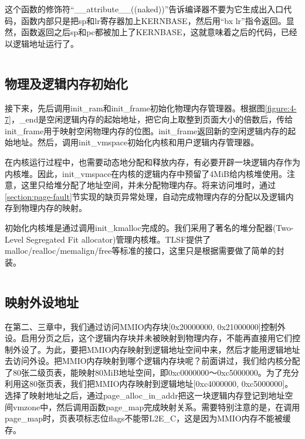 \documentclass[main.tex]{subfiles}
\begin{document}
\begin{CJK*}{UTF8}{song}
这个函数的修饰符“\_\_attribute\_\_((naked))”告诉编译器不要为它生成出入口代码，函数内部只是把sp和lr寄存器加上KERNBASE，然后用“bx lr”指令返回。显然，函数返回之后sp和pc都被加上了KERNBASE，这就意味着之后的代码，已经以逻辑地址运行了。

\begin{code}
\label{code:4-25}
\inputminted[firstline=337,lastline=345,linenos,numbersep=5pt,frame=lines,framesep=2mm]{c}{src/chapter04/kernel/machdep.c}
\end{code}

\subsection{物理及逻辑内存初始化}
接下来，先后调用init\_ram和init\_frame初始化物理内存管理器。根据图\ref{figure:4-7}，\_end是空闲逻辑内存的起始地址，把它向上取整到页面大小的倍数后，传给init\_frame用于映射空闲物理内存的位图。init\_frame返回新的空闲逻辑内存的起始地址。然后，调用init\_vmspace初始化内核和用户逻辑内存管理器。

\par
在内核运行过程中，也需要动态地分配和释放内存，有必要开辟一块逻辑内存作为内核堆。因此，init\_vmspace在内核的逻辑内存中预留了4MiB给内核堆使用。注意，这里只给堆分配了地址空间，并未分配物理内存。将来访问堆时，通过\ref{section:page-fault}节实现的缺页异常处理，自动完成物理内存的分配以及逻辑内存到物理内存的映射。

\par
初始化内核堆是通过调用init\_kmalloc完成的。我们采用了著名的堆分配器(Two-Level Segregated Fit allocator)管理内核堆。TLSF提供了malloc/realloc/memalign/free等标准的接口，这里只是根据需要做了简单的封装。

\begin{code}
\label{code:4-26}
\inputminted[firstline=362,lastline=377,linenos,numbersep=5pt,frame=lines,framesep=2mm]{c}{src/chapter04/kernel/machdep.c}
\end{code}

\subsection{映射外设地址}
在第二、三章中，我们通过访问MMIO内存块[0x20000000, 0x21000000]控制外设。启用分页之后，这个逻辑内存块并未被映射到物理内存，不能再直接用它们控制外设了。为此，要把MMIO内存映射到逻辑地址空间中来，然后才能用逻辑地址去访问外设。把MMIO内存映射到哪个逻辑内存块呢？前面讲过，我们给内核分配了80张二级页表，能映射80MiB地址空间，即0xc0000000～0xc5000000。为了充分利用这80张页表，我们把MMIO内存映射到逻辑地址[0xc4000000, 0xc5000000]。选择了映射地址之后，通过page\_alloc\_in\_addr把这一块逻辑内存登记到地址空间vmzone中，然后调用函数page\_map完成映射关系。需要特别注意的是，在调用page\_map时，页表项标志位flags不能带L2E\_C，这是因为MMIO内存不能被缓存。


\end{CJK*}
\end{document}
